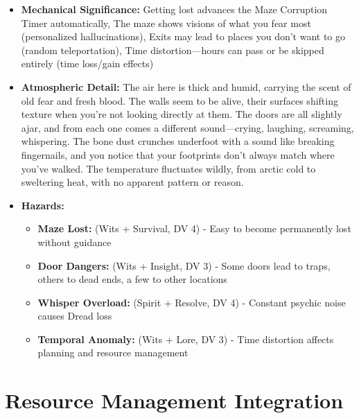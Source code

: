 \documentclass[11pt]{article}
\begin{document}
\begin{enumerate}
\begin{itemize}
  \item \textbf{Mechanical Significance:} Getting lost advances the Maze Corruption Timer automatically, The maze shows visions of what you fear most (personalized hallucinations), Exits may lead to places you don't want to go (random teleportation), Time distortion---hours can pass or be skipped entirely (time loss/gain effects)
  \item \textbf{Atmospheric Detail:} The air here is thick and humid, carrying the scent of old fear and fresh blood. The walls seem to be alive, their surfaces shifting texture when you're not looking directly at them. The doors are all slightly ajar, and from each one comes a different sound---crying, laughing, screaming, whispering. The bone dust crunches underfoot with a sound like breaking fingernails, and you notice that your footprints don't always match where you've walked. The temperature fluctuates wildly, from arctic cold to sweltering heat, with no apparent pattern or reason.
  \item \textbf{Hazards:}
    \begin{itemize}
    \item \textbf{Maze Lost:} (Wits + Survival, DV 4) - Easy to become permanently lost without guidance
    \item \textbf{Door Dangers:} (Wits + Insight, DV 3) - Some doors lead to traps, others to dead ends, a few to other locations
    \item \textbf{Whisper Overload:} (Spirit + Resolve, DV 4) - Constant psychic noise causes Dread loss
    \item \textbf{Temporal Anomaly:} (Wits + Lore, DV 3) - Time distortion affects planning and resource management
    \end{itemize}
  \end{itemize}
\end{enumerate}

\section{Resource Management Integration}
\end{document}
